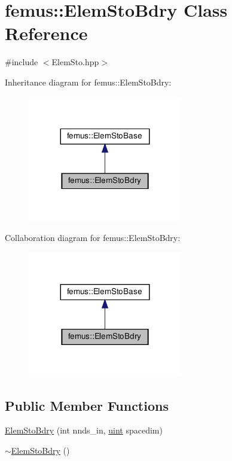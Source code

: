 \hypertarget{classfemus_1_1_elem_sto_bdry}{}\section{femus\+:\+:Elem\+Sto\+Bdry Class Reference}
\label{classfemus_1_1_elem_sto_bdry}


{\ttfamily \#include $<$Elem\+Sto.\+hpp$>$}



Inheritance diagram for femus\+:\+:Elem\+Sto\+Bdry\+:
\nopagebreak
\begin{figure}[H]
\begin{center}
\leavevmode
\includegraphics[width=191pt]{classfemus_1_1_elem_sto_bdry__inherit__graph}
\end{center}
\end{figure}


Collaboration diagram for femus\+:\+:Elem\+Sto\+Bdry\+:
\nopagebreak
\begin{figure}[H]
\begin{center}
\leavevmode
\includegraphics[width=191pt]{classfemus_1_1_elem_sto_bdry__coll__graph}
\end{center}
\end{figure}
\subsection*{Public Member Functions}
\begin{DoxyCompactItemize}
\item 
\mbox{\hyperlink{classfemus_1_1_elem_sto_bdry_a5aa20e3da196878003f75eaa7c7385ad}{Elem\+Sto\+Bdry}} (int nnds\+\_\+in, \mbox{\hyperlink{_typedefs_8hpp_a91ad9478d81a7aaf2593e8d9c3d06a14}{uint}} spacedim)
\item 
\mbox{\hyperlink{classfemus_1_1_elem_sto_bdry_a11b920a31ac9d74282a679a46197ba36}{$\sim$\+Elem\+Sto\+Bdry}} ()
\end{DoxyCompactItemize}
